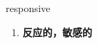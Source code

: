 
\begin{frame}
{\huge responsive}
\begin{center}
\begin{enumerate}\Large
  \item \textbf{反应的，敏感的}
\end{enumerate}
\end{center}
\end{frame}
